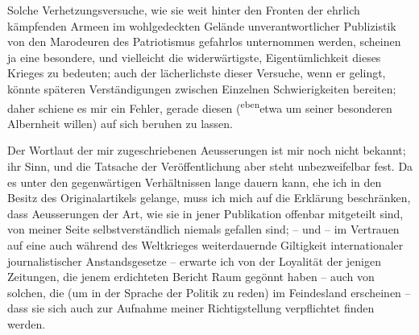 \pstart
           Solche Verhetzungsversuche, wie sie weit hinter den Fronten der ehrlich kämpfenden
               Armeen im wohlgedeckten Gelände unverantwortlicher Publizistik von den Marodeuren des
               Patriotismus gefahrlos unternommen werden, scheinen ja eine besondere, und vielleicht
               die widerwärtigste, Eigentümlichkeit dieses Krieges zu bedeuten; auch der
               lächerlichste dieser Ver{\pb}suche, wenn er gelingt, könnte
               späteren Verständigungen zwischen Einzelnen Schwierigkeiten bereiten; daher schiene
               es mir ein Fehler, gerade diesen (\substVorne{}\textsuperscript{eben}\substDazwischen{}etwa\substHinten{} um seiner besonderen Albernheit willen) auf sich beruhen zu lassen.\pend
           
\pstart
           Der Wortlaut der mir zugeschriebenen Aeusserung\introOben{}en\introOben{} ist mir
               noch nicht bekannt; ihr Sinn, und die Tatsache der Veröffentlichung aber steht
               unbezweifelbar fest. Da es unter den gegenwärtigen Verhältnissen lange dauern kann,
               ehe ich in den Besitz des Originalartikels gelange, muss ich mich auf die Erklärung beschränken, dass
               Aeusserungen der Art, wie sie in jener Publikation offenbar mitgeteilt sind, von
               meiner Seite selbstverständlich niemals gefallen sind; – und – im Vertrauen auf eine
               auch während des Weltkrieges weiterdauernde Giltigkeit internationaler
               journalistischer Anstandsgesetze – erwarte ich von {\pb}der
               Loyalität der jenigen Zeitungen, die jenem erdichteten Bericht Raum gegönnt haben –
               auch von solchen, die (um in der Sprache der Politik zu reden) im Feindesland
               erscheinen – dass sie sich auch zur Aufnahme meiner Richtigstellung verpflichtet
               finden werden.\pend
           
